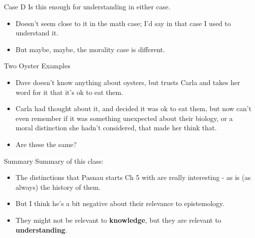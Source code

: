 \documentclass[
  17pt,
  letterpaper,
  ignorenonframetext,
  aspectratio=169,
  handout]{beamer}
\providecommand{\tightlist}{%
  \setlength{\itemsep}{0pt}\setlength{\parskip}{0pt}}\usepackage{longtable,booktabs,array}
\begin{document}
\begin{frame}{Case D}
\protect\hypertarget{case-d}{}
Is this enough for understanding in either case.

\begin{itemize}[<+->]
\tightlist
\item
  Doesn't seem close to it in the math case; I'd say in that case I used
  to understand it.
\item
  But maybe, maybe, the morality case is different.
\end{itemize}
\end{frame}

\begin{frame}{Two Oyster Examples}
\protect\hypertarget{two-oyster-examples}{}
\begin{itemize}[<+->]
\tightlist
\item
  Dave doesn't know anything about oysters, but trusts Carla and takes
  her word for it that it's ok to eat them.
\item
  Carla had thought about it, and decided it was ok to eat them, but now
  can't even remember if it was something unexpected about their
  biology, or a moral distinction she hadn't considered, that made her
  think that.
\item
  Are these the same?
\end{itemize}
\end{frame}

\begin{frame}{Summary}
\protect\hypertarget{summary}{}
Summary of this class:

\begin{itemize}[<+->]
\tightlist
\item
  The distinctions that Pasnau starts Ch 5 with are really interesting -
  as is (as always) the history of them.
\item
  But I think he's a bit negative about their relevance to epistemology.
\item
  They might not be relevant to \textbf{knowledge}, but they are
  relevant to \textbf{understanding}.
\end{itemize}
\end{frame}
\end{document}

